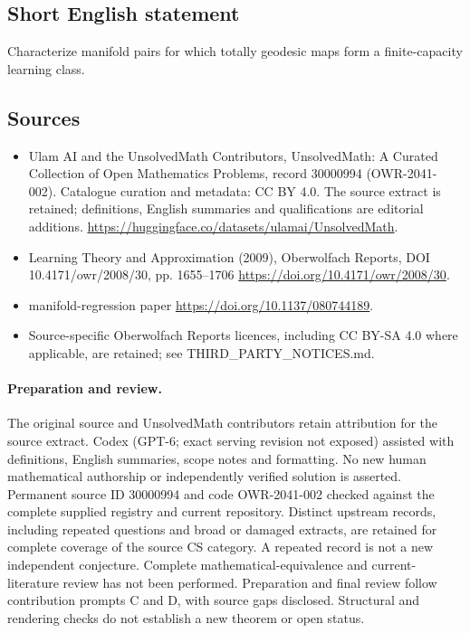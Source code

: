 \documentclass[11pt]{article}
\begin{document}
\subsection{Short English statement}
Characterize manifold pairs for which totally geodesic maps form a finite-capacity learning class.
\subsection{Sources}
\begin{itemize}
\item[\hypertarget{source:30000994:1}{S1}] Ulam AI and the UnsolvedMath Contributors, UnsolvedMath: A Curated Collection of Open Mathematics Problems, record 30000994 (OWR-2041-002). Catalogue curation and metadata: CC BY 4.0. The source extract is retained; definitions, English summaries and qualifications are editorial additions.
\url{https://huggingface.co/datasets/ulamai/UnsolvedMath}.
\item[\hypertarget{source:30000994:2}{S2}] Learning Theory and Approximation (2009), Oberwolfach Reports, DOI 10.4171/owr/2008/30, pp. 1655--1706
\url{https://doi.org/10.4171/owr/2008/30}.
\item[\hypertarget{source:30000994:3}{S3}] manifold-regression paper
\url{https://doi.org/10.1137/080744189}.
\item Source-specific Oberwolfach Reports licences, including CC BY-SA 4.0 where applicable, are retained; see THIRD\_PARTY\_NOTICES.md.
\end{itemize}
\paragraph{Preparation and review.}
The original source and UnsolvedMath contributors retain attribution for the source extract. Codex (GPT-6; exact serving revision not exposed) assisted with definitions, English summaries, scope notes and formatting. No new human mathematical authorship or independently verified solution is asserted. Permanent source ID 30000994 and code OWR-2041-002 checked against the complete supplied registry and current repository. Distinct upstream records, including repeated questions and broad or damaged extracts, are retained for complete coverage of the source CS category. A repeated record is not a new independent conjecture. Complete mathematical-equivalence and current-literature review has not been performed. Preparation and final review follow contribution prompts C and D, with source gaps disclosed. Structural and rendering checks do not establish a new theorem or open status.
\label{end:30000994}
\end{document}
